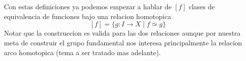 Con estas definiciones ya podemos empezar a hablar de \([f]\) clases
de equivalencia de funciones bajo una relacion homotopica
\[ [f] = \{ g : I \to X \mid f \stackrel{.}{\simeq} g \} \]
Notar que la construccion es valida para las dos relaciones aunque por
nuestra meta de construir el grupo fundamental nos interesa
principalmente la relacion arco homotopica (tema a ser tratado mas adelante).
